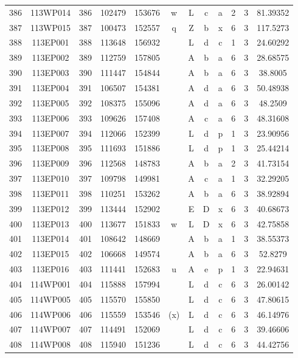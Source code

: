 \begin{tabular}{|*{12}{c|}}
386 & 113WP014 & 386 & 102479 & 153676 & w & L & c & a & 2 & 3 & 81.39352 \\ 
387 & 113WP015 & 387 & 100473 & 152557 & q & Z & b & x & 6 & 3 & 117.5273 \\ 
388 & 113EP001 & 388 & 113648 & 156932 &  & L & d & c & 1 & 3 & 24.60292 \\ 
389 & 113EP002 & 389 & 112759 & 157805 &  & A & b & a & 6 & 3 & 28.68575 \\ 
390 & 113EP003 & 390 & 111447 & 154844 &  & A & b & a & 6 & 3 & 38.8005 \\ 
391 & 113EP004 & 391 & 106507 & 154381 &  & A & d & a & 6 & 3 & 50.48938 \\ 
392 & 113EP005 & 392 & 108375 & 155096 &  & A & d & a & 6 & 3 & 48.2509 \\ 
393 & 113EP006 & 393 & 109626 & 157408 &  & A & c & a & 6 & 3 & 48.31608 \\ 
394 & 113EP007 & 394 & 112066 & 152399 &  & L & d & p & 1 & 3 & 23.90956 \\ 
395 & 113EP008 & 395 & 111693 & 151886 &  & L & d & p & 1 & 3 & 25.44214 \\ 
396 & 113EP009 & 396 & 112568 & 148783 &  & A & b & a & 2 & 3 & 41.73154 \\ 
397 & 113EP010 & 397 & 109798 & 149981 &  & A & c & a & 1 & 3 & 32.29205 \\ 
398 & 113EP011 & 398 & 110251 & 153262 &  & A & b & a & 6 & 3 & 38.92894 \\ 
399 & 113EP012 & 399 & 113444 & 152902 &  & E & D & x & 6 & 3 & 40.68673 \\ 
400 & 113EP013 & 400 & 113677 & 151833 & w & L & D & x & 6 & 3 & 42.75858 \\ 
401 & 113EP014 & 401 & 108642 & 148669 &  & A & b & a & 1 & 3 & 38.55373 \\ 
402 & 113EP015 & 402 & 106668 & 149574 &  & A & b & a & 6 & 3 & 52.8279 \\ 
403 & 113EP016 & 403 & 111441 & 152683 & u & A & e & p & 1 & 3 & 22.94631 \\ 
404 & 114WP001 & 404 & 115888 & 157994 &  & L & d & c & 6 & 3 & 26.00142 \\ 
405 & 114WP005 & 405 & 115570 & 155850 &  & L & d & c & 6 & 3 & 47.80615 \\ 
406 & 114WP006 & 406 & 115559 & 153546 & (x) & L & d & c & 6 & 3 & 46.14976 \\ 
407 & 114WP007 & 407 & 114491 & 152069 &  & L & d & c & 6 & 3 & 39.46606 \\ 
408 & 114WP008 & 408 & 115940 & 151236 &  & L & d & c & 6 & 3 & 44.42756 \\ 

\end{tabular}
